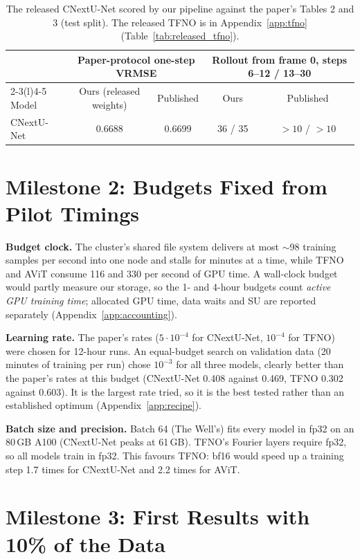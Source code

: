 \documentclass[11pt]{article}
\begin{document}
\begin{table}[!htbp]
\centering\small
\begin{tabular}{@{}lcccc@{}}
\toprule
& \multicolumn{2}{c}{Paper-protocol one-step VRMSE} & \multicolumn{2}{c}{Rollout from frame 0, steps 6--12 / 13--30} \\
\cmidrule(lr){2-3}\cmidrule(l){4-5}
Model & Ours (released weights) & Published & Ours & Published \\
\midrule
CNextU-Net & 0.6688 & 0.6699 & 36 / 35 & $>10$ / $>10$ \\
\bottomrule
\end{tabular}
\caption{The released CNextU-Net scored by our pipeline against the paper's Tables 2 and 3 (test split). The
released TFNO is in Appendix~\ref{app:tfno} (Table~\ref{tab:released_tfno}).}
\label{tab:released}
\end{table}

\section{Milestone 2: Budgets Fixed from Pilot Timings}
\label{sec:m2}

\textbf{Budget clock.} The cluster's shared file system delivers at most $\sim$98 training samples per second into
one node and stalls for minutes at a time, while TFNO and AViT consume 116 and 330 per second of GPU time. A
wall-clock budget would partly measure our storage, so the 1- and 4-hour budgets count \emph{active GPU training
time}; allocated GPU time, data waits and SU are reported separately (Appendix~\ref{app:accounting}).

\textbf{Learning rate.} The paper's rates ($5\cdot10^{-4}$ for CNextU-Net, $10^{-4}$ for TFNO) were chosen for
12-hour runs. An equal-budget search on validation data (20 minutes of training per run) chose $10^{-3}$ for all
three models, clearly better than the paper's rates at this budget (CNextU-Net 0.408 against 0.469, TFNO 0.302
against 0.603). It is the largest rate tried, so it is the best tested rather than an established optimum
(Appendix~\ref{app:recipe}).

\textbf{Batch size and precision.} Batch 64 (The Well's) fits every model in fp32 on an 80\,GB A100 (CNextU-Net
peaks at 61\,GB). TFNO's Fourier layers require fp32, so all models train in fp32. This favours TFNO: bf16 would
speed up a training step 1.7 times for CNextU-Net and 2.2 times for AViT.

\section{Milestone 3: First Results with 10\% of the Data}
\label{sec:results}
\end{document}
